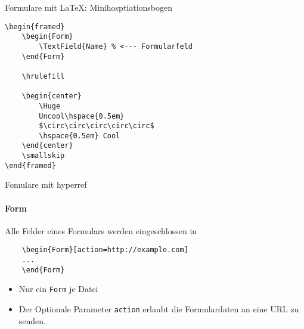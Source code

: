 \documentclass{beamer}
\begin{document}
\begin{frame}[fragile]{Formulare mit \LaTeX: Minihosptiationsbogen}

\begin{verbatim}
\begin{framed}
    \begin{Form}
        \TextField{Name} % <--- Formularfeld
    \end{Form}

    \hrulefill

    \begin{center}
        \Huge
        Uncool\hspace{0.5em}
        $\circ\circ\circ\circ\circ$
        \hspace{0.5em} Cool
    \end{center}
    \smallskip
\end{framed}
\end{verbatim}
\end{frame}

\begin{frame}[fragile]{Fomulare mit hyperref}
\framesubtitle{Form}
Alle Felder eines Formulars werden eingeschlossen in
\begin{verbatim}
    \begin{Form}[action=http://example.com]
    ...
    \end{Form}
\end{verbatim}
\begin{itemize}
\item Nur ein \texttt{Form} je Datei
\item Der Optionale Parameter \texttt{action} erlaubt die Formulardaten an eine URL zu senden.
\end{itemize}
\end{frame}


\end{document}
